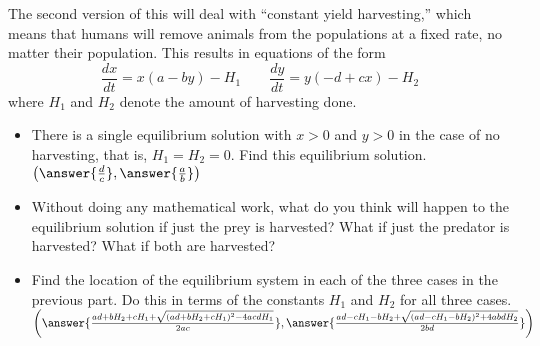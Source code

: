 \documentclass{ximera}
\begin{document}
\begin{exercise}
    The second version of this will deal with ``constant yield harvesting,'' which means that humans will remove animals from the populations at a fixed rate, no matter their population. This results in equations of the form
    \[ 
        \frac{dx}{dt} = x(a - by) - H_1 \qquad \frac{dy}{dt} = y(-d + cx) - H_2 
    \] 
    where $H_1$ and $H_2$ denote the amount of harvesting done.
    \begin{itemize}
        \item There is a single equilibrium solution with $x > 0$ and $y>0$ in the case of no harvesting, that is, $H_1 = H_2 = 0$. Find this equilibrium solution.\\
            $\left(\answer{\frac{d}{c}}, \answer{\frac{a}{b}}\right)$
        \item Without doing any mathematical work, what do you think will happen to the equilibrium solution if just the prey is harvested? What if just the predator is harvested? What if both are harvested?
        \item Find the location of the equilibrium system in each of the three cases in the previous part. Do this in terms of the constants $H_1$ and $H_2$ for all three cases. \\
            $\left( \answer{\frac{ad+bH_2 + cH_1 + \sqrt{(ad+bH_2 + cH_1)^2 - 4acdH_1}}{2ac}}, \answer{\frac{ad-cH_1 - bH_2 + \sqrt{(ad-cH_1 - bH_2)^2 +4abdH_2}}{2bd}}\right)$
    \end{itemize}
\end{exercise}
\end{document}
